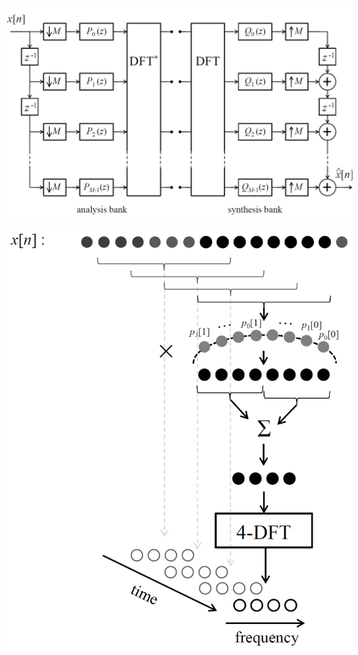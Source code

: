 \begin{minipage}{.6\textwidth}
	\includegraphics[width=\textwidth]{../fig/dft_filterbank}
\end{minipage}
\begin{minipage}{.4\textwidth}
	\includegraphics[width=\textwidth]{../fig/dft_filter_ill}
\end{minipage}
